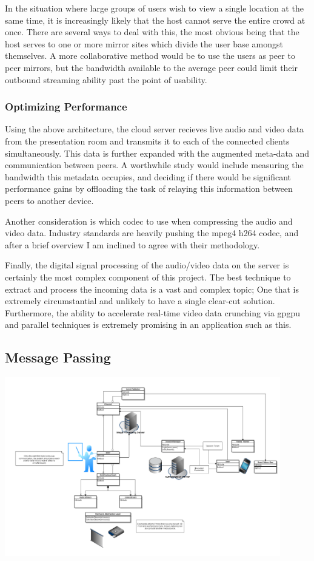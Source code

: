 \documentclass[a4paper,12pt]{report}
\begin{document}
In the situation where large groups of users wish to view a single location at the same time, it is increasingly likely that the host cannot serve the entire crowd at once. There are several ways to deal with this, the most obvious being that the host serves to one or more mirror sites which divide the user base amongst themselves. A more collaborative method would be to use the users as peer to peer mirrors, but the bandwidth available to the average peer could limit their outbound streaming ability past the point of usability.

	\subsubsection{Optimizing Performance}
Using the above architecture, the cloud server recieves live audio and video data from the presentation room and transmits it to each of the connected clients simultaneously. This data is further expanded with the augmented meta-data and communication between peers. A worthwhile study would include measuring the bandwidth this metadata occupies, and deciding if there would be significant performance gains by offloading the task of relaying this information between peers to another device.

Another consideration is which codec to use when compressing the audio and video data. Industry standards are heavily pushing the mpeg4 h264 codec, and after a brief overview I am inclined to agree with their methodology.

Finally, the digital signal processing of the audio/video data on the server is certainly the most complex component of this project. The best technique to extract and process the incoming data is a vast and complex topic; One that is extremely circumstantial and unlikely to have a single clear-cut solution. Furthermore, the ability to accelerate real-time video data crunching via gpgpu and parallel techniques is extremely promising in an application such as this.

\subsection{Message Passing}
\includegraphics[width=12cm]{blockDiagram}
\end{document}

